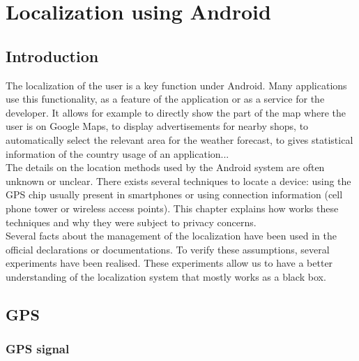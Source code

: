 \chapter{Localization using Android}
\label{chap:and-loc}

\section*{Introduction}
The localization of the user is a key function under Android.
Many applications use this functionality, as a feature of the application or as a service for the developer.
It allows for example to directly show the part of the map where the user is on Google Maps, to display advertisements for nearby shops, to automatically select the relevant area for the weather forecast, to gives statistical information of the country usage of an application...\\

The details on the location methods used by the Android system are often unknown or unclear.
There exists several techniques to locate a device: using the GPS chip usually present in smartphones or using connection information (cell phone tower or wireless access points).
This chapter explains how works these techniques and why they were subject to privacy concerns.\\

Several facts about the management of the localization have been used in the official declarations or documentations.
To verify these assumptions, several experiments have been realised.
These experiments allow us to have a better understanding of the localization system that mostly works as a black box.


\section{GPS}
\label{sec:loc-gps}

\subsection{GPS signal}

